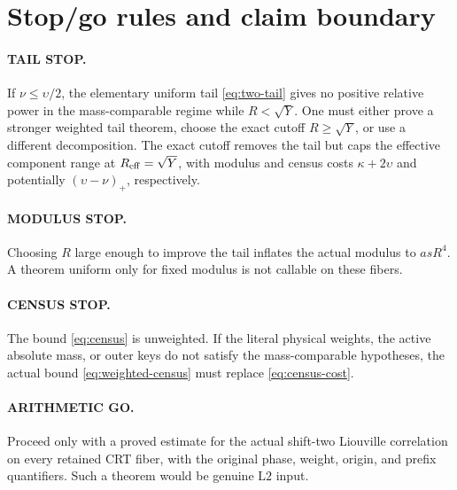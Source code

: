 \documentclass[11pt]{article}
\theoremstyle{definition}
\theoremstyle{remark}
\newcommand{\Ltwo}{\mathrm{L2}}
\begin{document}
\section{Stop/go rules and claim boundary}

\paragraph{TAIL STOP.}
If \(\nu\le\upsilon/2\), the elementary uniform tail
\eqref{eq:two-tail} gives no positive relative power in the
mass-comparable regime while \(R<\sqrt Y\).  One must either prove a
stronger weighted tail theorem, choose the exact cutoff
\(R\ge\sqrt Y\), or use a different decomposition.  The exact cutoff
removes the tail but caps the effective component range at
\(R_{\rm eff}=\sqrt Y\), with modulus and census costs
\(\kappa+2\upsilon\) and potentially
\((\upsilon-\nu)_+\), respectively.

\paragraph{MODULUS STOP.}
Choosing \(R\) large enough to improve the tail inflates the actual
modulus to \(asR^4\).  A theorem uniform only for fixed modulus is
not callable on these fibers.

\paragraph{CENSUS STOP.}
The bound \eqref{eq:census} is unweighted.  If the literal physical
weights, the active absolute mass, or outer keys do not satisfy the
mass-comparable hypotheses, the actual bound
\eqref{eq:weighted-census} must replace
\eqref{eq:census-cost}.

\paragraph{ARITHMETIC GO.}
Proceed only with a proved estimate for the actual shift-two
Liouville correlation on every retained CRT fiber, with the original
phase, weight, origin, and prefix quantifiers.  Such a theorem would
be genuine \(\Ltwo\) input.
\end{document}
